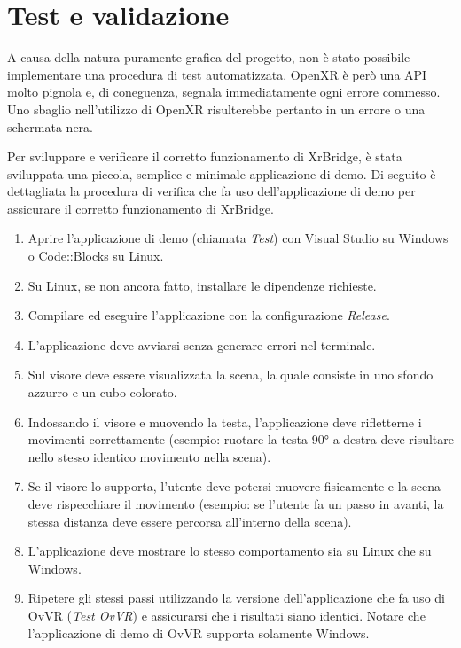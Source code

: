\documentclass[twoside]{supsistudent}
\begin{document}
\chapter{Test e validazione}

A causa della natura puramente grafica del progetto, non è stato possibile implementare una procedura di test automatizzata. OpenXR è però una API molto pignola e, di coneguenza, segnala immediatamente ogni errore commesso. Uno sbaglio nell'utilizzo di OpenXR risulterebbe pertanto in un errore o una schermata nera.

Per sviluppare e verificare il corretto funzionamento di XrBridge, è stata sviluppata una piccola, semplice e minimale applicazione di demo. Di seguito è dettagliata la procedura di verifica che fa uso dell'applicazione di demo per assicurare il corretto funzionamento di XrBridge.

\begin{enumerate}
  \item Aprire l'applicazione di demo (chiamata \textit{Test}) con Visual Studio su Windows o Code::Blocks su Linux.
  \item Su Linux, se non ancora fatto, installare le dipendenze richieste.
  \item Compilare ed eseguire l'applicazione con la configurazione \textit{Release}.
  \item L'applicazione deve avviarsi senza generare errori nel terminale.
  \item Sul visore deve essere visualizzata la scena, la quale consiste in uno sfondo azzurro e un cubo colorato.
  \item Indossando il visore e muovendo la testa, l'applicazione deve rifletterne i movimenti correttamente (esempio: ruotare la testa 90° a destra deve risultare nello stesso identico movimento nella scena).
  \item Se il visore lo supporta, l'utente deve potersi muovere fisicamente e la scena deve rispecchiare il movimento (esempio: se l'utente fa un passo in avanti, la stessa distanza deve essere percorsa all'interno della scena).
  \item L'applicazione deve mostrare lo stesso comportamento sia su Linux che su Windows.
  \item Ripetere gli stessi passi utilizzando la versione dell'applicazione che fa uso di OvVR (\textit{Test OvVR}) e assicurarsi che i risultati siano identici. Notare che l'applicazione di demo di OvVR supporta solamente Windows.
\end{enumerate}
\end{document}
